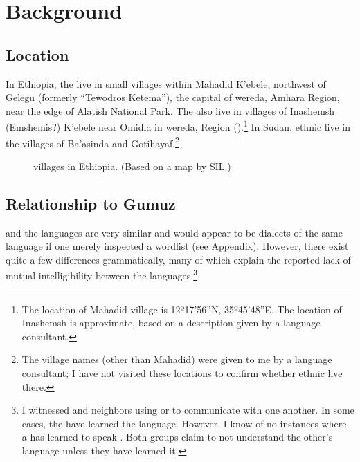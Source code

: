 \documentclass[output=paper]{langsci/langscibook}
\begin{document}
\section{Background}\label{sec:ahlandc:2}

\subsection{Location}\label{sec:ahlandc:2.1}

In Ethiopia, the  live in small villages within Mahadid K’ebele, northwest of Gelegu (formerly “Tewodros Ketema”), the capital of  wereda, Amhara Region, near the edge of Alatish National Park. The  also live in villages of Inashemsh (Emshemis?) K’ebele near Omidla in  wereda,  Region ().\footnote{The location of Mahadid village is  12º17'56''N, 35º45'48''E. The location of Inashemsh is approximate, based on a description given by a  language consultant.} In Sudan, ethnic  live in the villages of Ba’asinda and Gotihayaf.\footnote{The village names (other than Mahadid) were given to me by a  language consultant; I have not visited these locations to confirm whether ethnic  live there. }

 
\begin{figure}
\caption{ villages in Ethiopia. (Based on a map by SIL.)}
\label{fig:ahlandc:1} 
\end{figure}

\subsection{Relationship to Gumuz}\label{sec:ahlandc:2.2}

 

 and the  languages are very similar and would appear to be dialects of the same language if one merely inspected a wordlist (see Appendix). However, there exist quite a few differences grammatically, many of which explain the reported lack of mutual intelligibility between the languages.\footnote{I witnessed  and  neighbors using  or  to communicate with one another. In some cases, the  have learned the  language. However, I know of no instances where a  has learned to speak . Both groups claim to not understand the other’s language unless they have learned it.}
\end{document}
